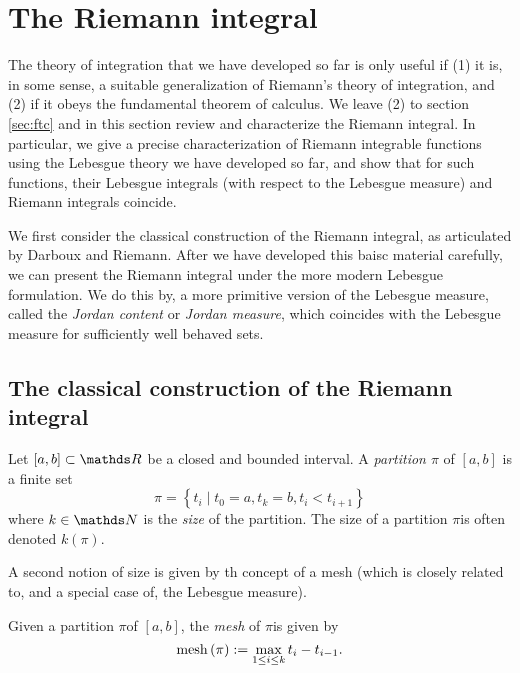 \section{The Riemann integral\label{sec:riemannIntegral}}

The theory of integration that we have developed so far is only useful
if (1) it is, in some sense, a suitable generalization of Riemann's
theory of integration, and (2) if it obeys the fundamental theorem
of calculus. We leave (2) to section \ref{sec:ftc} and in this section
review and characterize the Riemann integral. In particular, we give
a precise characterization of Riemann integrable functions using the
Lebesgue theory we have developed so far, and show that for such functions,
their Lebesgue integrals (with respect to the Lebesgue measure) and
Riemann integrals coincide.

We first consider the classical construction of the Riemann integral,
as articulated by Darboux and Riemann. After we have developed this
baisc material carefully, we can present the Riemann integral under
the more modern Lebesgue formulation. We do this by, a more primitive
version of the Lebesgue measure, called the \emph{Jordan content }or
\emph{Jordan measure}, which coincides with the Lebesgue measure for
sufficiently well behaved sets.

\subsection{The classical construction of the Riemann integral}
\begin{defn}
\label{def:partitionInterval}Let $\left[a,b\right]\subset\R$ be
a closed and bounded interval. A \emph{partition $\pi$ }of $\left[a,b\right]$
is a finite set
\[
\pi=\left\{ t_{i}\mid t_{0}=a,t_{k}=b,t_{i}<t_{i+1}\right\} 
\]
where $k\in\N$ is the \emph{size }of the partition. The size of a
partition $\pi$is often denoted $k\left(\pi\right).$
\end{defn}

A second notion of size is given by th concept of a mesh (which is
closely related to, and a special case of, the Lebesgue measure).
\begin{defn}
\label{def:meshPartition}Given a partition $\pi$of $\left[a,b\right]$,
the\emph{ mesh }of $\pi$is given by 
\[
\mathrm{mesh}\left(\pi\right):=\max_{1\leq i\leq k}t_{i}-t_{i-1}.
\]
\end{defn}

